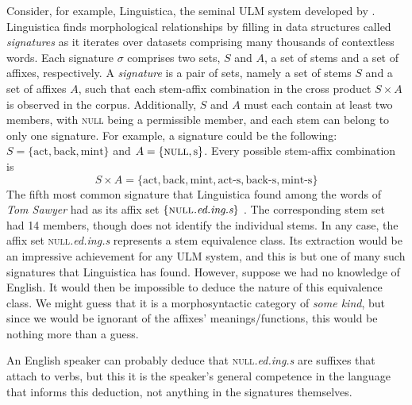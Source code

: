 Consider, for example, Linguistica, the seminal 
\ac{ULM}  system developed by \cite{goldsmith:2001, goldsmith:2006}. 
Linguistica finds morphological relationships by filling in 
data structures 
called \emph{signatures} as it iterates over datasets comprising many
thousands of contextless words. Each signature $\sigma$ 
comprises 
two sets, $S$ and $A$, a set of stems and a set of affixes, 
respectively.
A \emph{signature} is a pair of sets, namely a set of stems $S$ and 
a set of affixes $A$, such that each stem-affix combination in the cross 
product $S \times A$ is observed in the corpus. Additionally, $S$ and 
$A$ must each contain at least two members, with \textsc{null} being 
a permissible member, and each stem can belong to only one signature.  
For example, a signature could be the following: $S = \{ \text{act}, \text{back}, \text{mint} \}$ 
and $A = \{ \textsc{null}, \text{s}\}$. Every possible stem-affix combination is 
\begin{equation}
\label{eq:SxA}
S \times A = \{ \text{act}, \text{back}, \text{mint}, \text{act-s}, 
\text{back-s}, \text{mint-s}\}
\end{equation}
The fifth 
most common signature that Linguistica found among the words of 
\textit{Tom Sawyer} had as its affix set $\{\textsc{null}\textit{.ed.ing.s}\}$ \citep{goldsmith:2001}. 
The corresponding stem set had 14 members, though \citet{goldsmith:2001} 
does not identify the individual stems. 
In any case, the affix set \textsc{null}\textit{.ed.ing.s} represents 
a stem equivalence class. Its extraction would be an impressive achievement for any \ac{ULM} system, and this
is but one of many such signatures that Linguistica has found. However, 
suppose we had no knowledge of English. It would then be impossible to deduce the nature 
of this equivalence class. We might
guess that it is a morphosyntactic category of \emph{some kind}, but since we would be ignorant
of the affixes' meanings/functions, this would be nothing more than a guess. 

An English speaker can probably deduce that \textsc{null}\textit{.ed.ing.s} are suffixes that attach to verbs,
but this it is the speaker's general competence in the language that informs this deduction, not anything in the 
signatures themselves.


